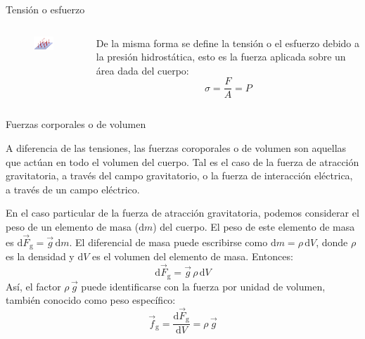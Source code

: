 \documentclass[11pt,handout,aspectratio=1610]{beamer}
\newcommand{\diff}[0]{\text{d}}
\newcommand{\fdiff}[2]{\dfrac{\text{d} #1}{\text{d} #2}}
\newcommand{\vs}{\vspace{11pt}}
\begin{document}
\begin{frame}{Tensión o esfuerzo}

    \begin{columns}
        \begin{column}{0.4\textwidth}
            \begin{figure}
                \centering
                \includegraphics{../figs/fluid_dynamics_pressure-1.pdf}
            \end{figure}
        \end{column}
        \begin{column}{0.4\textwidth}
            De la misma forma se define la tensión o el esfuerzo debido a la presión hidrostática, esto es la fuerza aplicada sobre un área dada del cuerpo: $$ \sigma = \frac{F}{A} = P$$
        \end{column}
    \end{columns}

\end{frame}

\begin{frame}{Fuerzas corporales o de volumen}
    
    A diferencia de las tensiones, las fuerzas coroporales o de volumen son aquellas que actúan en todo el volumen del cuerpo. Tal es el caso de la fuerza de atracción gravitatoria, a través del campo gravitatorio, o la fuerza de interacción eléctrica, a través de un campo eléctrico.

    \vs

    En el caso particular de la fuerza de atracción gravitatoria, podemos considerar el peso de un elemento de masa ($\diff{m}$) del cuerpo. El peso de este elemento de masa es $ \diff \vec{F}_\text{g} = \vec{g} \, \diff{m} $. El diferencial de masa puede escribirse como $\diff{m} = \rho \, \diff{V}$, donde $\rho$ es la densidad y $\diff{V}$ es el volumen del elemento de masa. Entonces: $$ \diff \vec{F}_\text{g} = \vec{g} \, \rho \, \diff{V} $$ Así, el factor $\rho \, \vec{g}$ puede identificarse con la fuerza por unidad de volumen, también conocido como peso específico: $$\vec{f}_\text{g} = \fdiff{\vec{F}_\text{g}}{V} = \rho \, \vec{g} $$

\end{frame}
\end{document}
